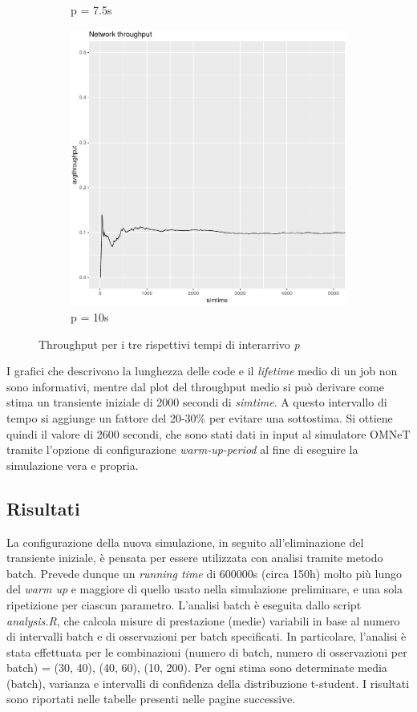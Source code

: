 \documentclass[a4paper,11pt]{article}
\begin{document}
\begin{figure}[h!]
\begin{subfigure}{.5\textwidth}
  \caption{p = 7.5s}
  \label{fig:sfig2}
\end{subfigure}
\begin{subfigure}{\textwidth}
  \centering
  \includegraphics[width=.45\linewidth]{images/chart-throughput-10.png}
  \caption{p = 10s}
  \label{fig:sfig2}
\end{subfigure}
\caption{Throughput per i tre rispettivi tempi di interarrivo \textit{p}}
\label{fig:fig}
\end{figure}
\newpage
I grafici che descrivono la lunghezza delle code e il \textit{lifetime} medio di un job non sono informativi, mentre dal plot del throughput medio si può derivare come stima un transiente iniziale di 2000 secondi di \textit{simtime}. \newline
A questo intervallo di tempo si aggiunge un fattore del 20-30\% per evitare una sottostima. \newline
Si ottiene quindi il valore di 2600 secondi, che sono stati dati in input al simulatore OMNeT tramite l'opzione di configurazione \textit{warm-up-period} al fine di eseguire la simulazione vera e propria.

\subsection{Risultati}
La configurazione della nuova simulazione, in seguito all'eliminazione del transiente iniziale, è pensata per essere utilizzata con analisi tramite metodo batch.\newline
Prevede dunque un \textit{running time} di 600000s (circa 150h) molto più lungo del \textit{warm up} e maggiore di quello usato nella simulazione preliminare, e una sola ripetizione per ciascun parametro.\newline
L'analisi batch è eseguita dallo script \textit{analysis.R}, che calcola misure di prestazione (medie) variabili in base al numero di intervalli batch e di osservazioni per batch specificati.\newline
In particolare, l'analisi è stata effettuata per le combinazioni (numero di batch, numero di osservazioni per batch) = {(30, 40), (40, 60), (10, 200)}.\newline
Per ogni stima sono determinate media (batch), varianza e intervalli di confidenza della distribuzione t-student.
I risultati sono riportati nelle tabelle presenti nelle pagine successive.
\end{document}
